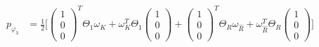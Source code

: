 \begin{align}
\\
p_{\varphi_3} &= \frac{1}{2} \Bigg[ \begin{pmatrix}1\\0\\0\end{pmatrix}^T\Theta_1\omega_K + \omega^T_K \Theta_1 \begin{pmatrix}1\\0\\0\end{pmatrix} + \begin{pmatrix}1\\0\\0\end{pmatrix}^T \Theta_R \omega_{\widehat{R}} + \omega^T_{\widehat{R}} \Theta_R \begin{pmatrix}1\\0\\0\end{pmatrix} \Bigg]
\end{align}